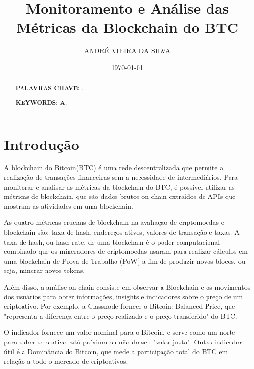 \documentclass[a4paper,12pt]{article}
\title{ \textbf{\large Monitoramento e Análise das Métricas da Blockchain do BTC}}
\author{ANDRÉ VIEIRA DA SILVA}
\date{\today}
\begin{document}
\maketitle


\begin{abstract}
\textbf{PALAVRAS CHAVE: }.
\end{abstract}

\begin{abstract}

\textbf{KEYWORDS: A}.
\end{abstract}


\newpage
\tableofcontents


\section{Introdução}
\hspace{0.5cm}A blockchain do Bitcoin(BTC) é uma rede descentralizada que permite 
a realização de transações financeiras sem a necessidade de intermediários. 
Para monitorar e analisar as métricas da blockchain do BTC, é possível utilizar 
as métricas de blockchain, que são dados brutos on-chain extraídos de APIs que 
mostram as atividades em uma blockchain.

As quatro métricas cruciais de blockchain na avaliação de criptomoedas e 
blockchain são: taxa de hash, endereços ativos, valores de transação e taxas.
A taxa de hash, ou hash rate, de uma blockchain é o poder computacional 
combinado que os mineradores de criptomoedas usaram para realizar cálculos 
em uma blockchain de Prova de Trabalho (PoW) a fim de produzir novos blocos, 
ou seja, minerar novos tokens.

Além disso, a análise on-chain consiste em observar a Blockchain e os 
movimentos dos usuários para obter informações, insights e indicadores 
sobre o preço de um criptoativo. 
Por exemplo, a Glassnode fornece o Bitcoin: Balanced Price, que 
"representa a diferença entre o preço realizado e o preço transferido" do BTC. 

O indicador fornece um valor nominal para o Bitcoin, e serve como um norte para 
saber se o ativo está próximo ou não do seu "valor justo".
Outro indicador útil é a Dominância do Bitcoin, que mede a participação total 
do BTC em relação a todo o mercado de criptoativos.
\end{document}
